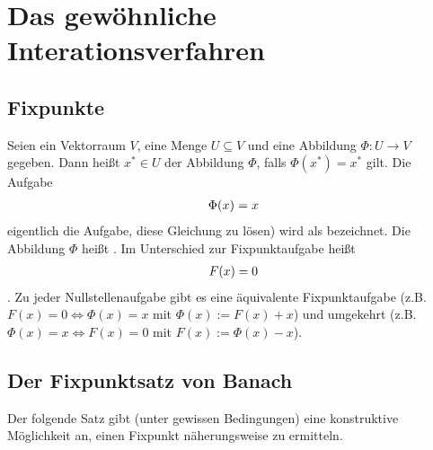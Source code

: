 \newpage
\section{Das gewöhnliche Interationsverfahren}
\subsection{Fixpunkte}

Seien ein Vektorraum $V$, eine Menge $U \subseteq V$ und eine Abbildung $\Phi: U \to V$ gegeben.
Dann heißt $x^{*} \in U$  der Abbildung $\Phi$, falls $\Phi(x^{*}) = x^{*}$ gilt.
Die Aufgabe
\begin{align}
	\Phi(x) = x\notag
\end{align}
eigentlich die Aufgabe, diese Gleichung zu lösen) wird als  bezeichnet.
Die Abbildung $\Phi$ heißt . Im Unterschied zur Fixpunktaufgabe heißt
\begin{align}
	F(x) = 0 \notag
\end{align}
. 
Zu jeder Nullstellenaufgabe gibt es eine äquivalente Fixpunktaufgabe (z.B. $F(x) = 0 \Leftrightarrow \Phi(x) = x $ mit $\Phi(x) := F(x) + x$) und umgekehrt (z.B.
$\Phi(x) = x \Leftrightarrow F(x) = 0$ mit $F(x) := \Phi(x) -x$).

\subsection{Der Fixpunktsatz von Banach}

Der folgende Satz gibt (unter gewissen Bedingungen) eine konstruktive Möglichkeit an, einen Fixpunkt näherungsweise zu ermitteln.

